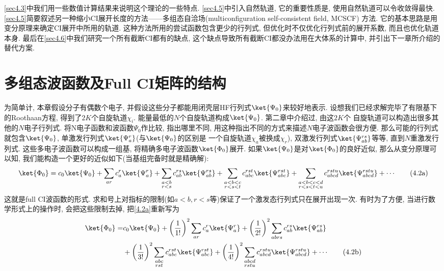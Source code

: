 \autoref{sec4.3}中我们用一些数值计算结果来说明这个理论的一些特点. \autoref{sec4.5}中引入自然轨道, 它的重要性质是, 使用自然轨道可以令收敛得最快. \autoref{sec4.5}简要叙述另一种缩小CI展开长度的方法——多组态自洽场(multiconfiguration self-consistent field, MCSCF) 方法. 它的基本思路是用变分原理来确定CI展开中所用的轨道. 这种方法所用的尝试函数包含更少的行列式, 但优化时不仅优化行列式前的展开系数, 而且也优化轨道本身. 最后在\autoref{sec4.6}中我们研究一个所有截断CI都有的缺点, 这个缺点导致所有截断CI都没办法用在大体系的计算中, 并引出下一章所介绍的替代方案.
\section{多组态波函数及Full CI矩阵的结构}
\label{sec4.1}
为简单计, 
本章假设分子有偶数个电子, 
并假设这些分子都能用闭壳层HF行列式$\ket{\Psi_0}$来较好地表示. 
设想我们已经求解完毕了有限基下的Roothaan方程, 
得到了$2K$个自旋轨道${\chi_i}$. 
能量最低的$N$个自旋轨道构成$\ket{\Psi_0}$. 
第二章中介绍过, 
由这$2K$个 自旋轨道可以构造出很多其他的$N$电子行列式. 
将N电子函数和\hft 波函数$\Psi_0$作比较, 
指出哪里不同, 
用这种指出不同的方式来描述$N$电子波函数会很方便. 
那么可能的行列式就包含$\ket{\Psi_0}$, 
单激发行列式$\ket{\Psi_a^r}$(与$\ket{\Psi_0}$的区别是
一个自旋轨道$\chi_a$被换成$\chi_r$), 
双激发行列式$\ket{\Psi_{ab}^{rs}}$等等, 
直到$N$重激发行列式. 
这些多电子波函数可以构成一组基, 
将精确多电子波函数$\ket{\Phi_0}$展开. 
如果$\ket{\Psi_0}$是对$\ket{\Phi_0}$的良好近似, 
那么从变分原理可以知, 
我们能构造一个更好的近似如下(当基组完备时就是精确解):
\begin{align}
\ket{\Phi_0} = c_0\ket{\Psi_0}+\sum_{ar}c_a^r\ket{\Psi_{a}^r} + \sum_{\substack{a<b\\r<s}}c_{ab}^{rs}\ket{\Psi_{ab}^{rs}} + \sum_{\substack{a<b<c\\r<s<t}}c_{abc}^{rst}\ket{\Psi_{abc}^{rst}}+ \sum_{\substack{a<b<c<d\\r<s<t<u}}c_{abcd}^{rstu}\ket{\Psi_{abcd}^{rstu}} + \cdots \tag{4.2a}
\label{4.2a}
\end{align}
这就是full CI波函数的形式. 
求和号上对指标的限制(如$a<b, r<s$等)保证了一个激发态行列式只在展开出现一次.
有时为了方便, 
当进行数学形式上的操作时, 
会把这些限制去掉, 
把\autoref{4.2a}重新写为
\begin{align}
\label{4.2}
\ket{\Phi_0} =& c_0\ket{\Psi_0}+ \left( \frac{1}{1!} \right)^2\sum_{ar}c_a^r\ket{\Psi_{a}^r} + \left( \frac{1}{2!} \right)^2\sum_{\substack{abrs}}c_{ab}^{rs}\ket{\Psi_{ab}^{rs}}\notag \\
&+\left( \frac{1}{3!} \right)^2 \sum_{\substack{abc\\rst}}c_{abc}^{rst}\ket{\Psi_{abc}^{rst}}+\left( \frac{1}{4!} \right)^2 \sum_{\substack{abcd\\rstu}}c_{abcd}^{rstu}\ket{\Psi_{abcd}^{rstu}} + \cdots \tag{4.2b}
\addtocounter{equation}{1}\end{align}
